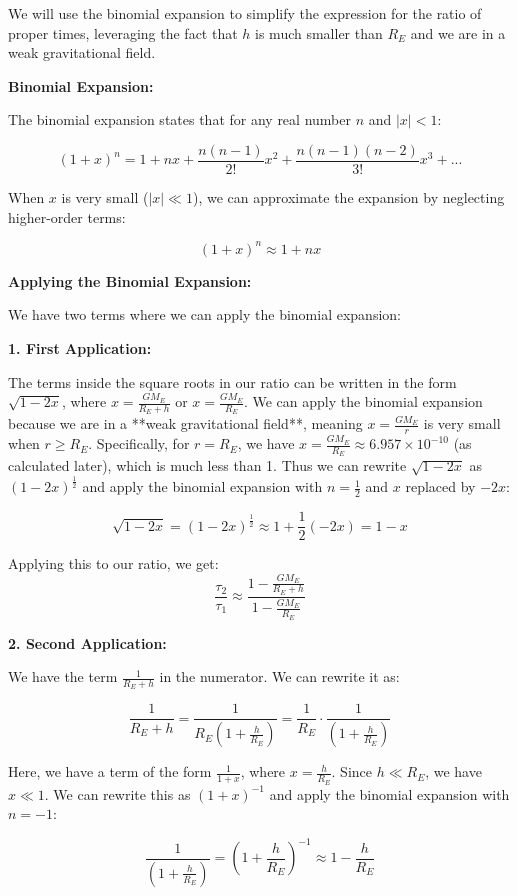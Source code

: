We will use the binomial expansion to simplify the expression for the ratio of proper times, leveraging the fact that \(h\) is much smaller than \(R_E\) and we are in a weak gravitational field.

\textbf{Binomial Expansion:}

The binomial expansion states that for any real number \(n\) and \(|x| < 1\):

\[ (1+x)^n = 1 + nx + \frac{n(n-1)}{2!}x^2 + \frac{n(n-1)(n-2)}{3!}x^3 + ... \]

When \(x\) is very small (\(|x| \ll 1\)), we can approximate the expansion by neglecting higher-order terms:

\[ (1+x)^n \approx 1 + nx \]

\textbf{Applying the Binomial Expansion:}

We have two terms where we can apply the binomial expansion:

\textbf{1. First Application:}

The terms inside the square roots in our ratio can be written in the form \(\sqrt{1 - 2x}\), where \(x = \frac{GM_E}{R_E + h}\) or \(x = \frac{GM_E}{R_E}\).  We can apply the binomial expansion because we are in a **weak gravitational field**, meaning \(x = \frac{GM_E}{r}\) is very small when \(r \geq R_E\). Specifically, for \(r = R_E\), we have \(x = \frac{GM_E}{R_E} \approx 6.957 \times 10^{-10}\) (as calculated later), which is much less than 1. Thus we can rewrite \(\sqrt{1 - 2x}\) as \((1 - 2x)^{\frac{1}{2}}\) and apply the binomial expansion with \(n = \frac{1}{2}\) and \(x\) replaced by \(-2x\):

\[
\sqrt{1 - 2x} = (1 - 2x)^{\frac{1}{2}} \approx 1 + \frac{1}{2}(-2x) = 1 - x
\]

Applying this to our ratio, we get:
\[
\frac{\tau_2}{\tau_1} \approx \frac{1 - \frac{GM_E}{R_E + h}}{1 - \frac{GM_E}{R_E}}
\]

\textbf{2. Second Application:}

We have the term \(\frac{1}{R_E + h}\) in the numerator. We can rewrite it as:

\[
\frac{1}{R_E + h} = \frac{1}{R_E(1 + \frac{h}{R_E})} = \frac{1}{R_E} \cdot \frac{1}{(1 + \frac{h}{R_E})}
\]

Here, we have a term of the form \(\frac{1}{1 + x}\), where \(x = \frac{h}{R_E}\). Since \(h \ll R_E\), we have \(x \ll 1\). We can rewrite this as \((1 + x)^{-1}\) and apply the binomial expansion with \(n = -1\):

\[
\frac{1}{(1 + \frac{h}{R_E})} = (1 + \frac{h}{R_E})^{-1} \approx 1 - \frac{h}{R_E}
\]

